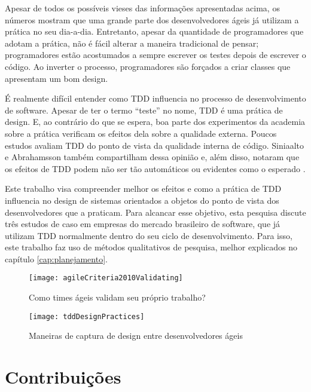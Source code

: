 Apesar de todos os possíveis vieses das informações apresentadas acima, os
números mostram que uma grande parte dos desenvolvedores ágeis já utilizam a 
prática no seu dia-a-dia.
Entretanto, apesar da quantidade de programadores que adotam a prática, não é
fácil alterar a maneira tradicional de pensar; programadores estão acostumados a
sempre escrever os testes depois de escrever o código. Ao inverter o processo,
programadores são forçados a criar classes que apresentam um bom design.

É realmente difícil entender como TDD influencia no processo de desenvolvimento
de software. Apesar de ter o termo ``teste'' no nome, TDD é uma prática
de design. E, ao contrário do que se espera, boa parte dos experimentos da
academia sobre a prática verificam os efeitos dela sobre a qualidade externa. 
Poucos estudos avaliam TDD do ponto de vista da qualidade interna de código.
Siniaalto e Abrahamsson também compartilham dessa opinião e, além disso, notaram
que os efeitos de TDD podem não ser tão automáticos ou evidentes como o 
esperado \cite{alarming-results}.

Este trabalho visa compreender melhor os efeitos e como a prática de TDD
influencia no design de sistemas orientados a objetos do ponto de vista dos
desenvolvedores que a praticam. Para alcancar esse objetivo,
esta pesquisa discute três estudos de caso em empresas do mercado brasileiro de
software, que já utilizam TDD normalmente dentro do seu ciclo de
desenvolvimento. Para isso, este trabalho faz uso de métodos qualitativos de
pesquisa, melhor explicados no capítulo \ref{cap:planejamento}.

\begin{figure}[ht]
  \begin{minipage}[b]{0.45\linewidth}
    \centering
    \texttt{[image: agileCriteria2010Validating]}
    \caption{Como times ágeis validam seu próprio trabalho?}
    \label{fig:wambler-agile-2010}
  \end{minipage}
  \hspace{0.5cm}
  \begin{minipage}[b]{0.45\linewidth}
    \centering
    \texttt{[image: tddDesignPractices]}
    \caption{Maneiras de captura de design entre desenvolvedores ágeis}  
    \label{fig:wambler-tdd-2008}
  \end{minipage}
\end{figure}			

\section{Contribuições}

